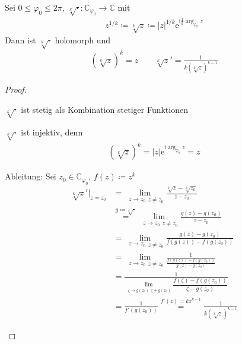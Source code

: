 \documentclass[a4paper,10pt]{scrbook}
\begin{document}
\begin{theorem}[Satz]
  Sei $0 \leq \varphi_0 \leq 2 \pi$, $\sqrt[k]{\cdot} : \mathbb{C}_{\varphi_0} \to \mathbb{C}$ mit
  \begin{align*}
    z^{1/k} \coloneq \sqrt[k]{z} \coloneq |z|^{1/k} \mathrm{e}^{\mathrm{i}\frac{1}{k}\arg_{\varphi_0}z}
  \end{align*}
  Dann ist $\sqrt[k]{\cdot}$ holomorph und
  \begin{align*}
    (\sqrt[k]{z})^k = z \qquad \sqrt[k]{z}' = \frac{1}{k (\sqrt[k]{z})^{k-1}}
  \end{align*}

  \begin{proof}
    \begin{enum-arab}
      \item $\sqrt[k]{\cdot}$ ist stetig als Kombination stetiger Funktionen

      \item $\sqrt[k]{\cdot}$ ist injektiv, denn
      \begin{align*}
        (\sqrt[k]{z})^k = |z| \mathrm{e}^{\mathrm{i} \arg_{\varphi_0}z} = z
      \end{align*}

      \item Ableitung: Sei $z_0 \in \mathbb{C}_{\varphi_0}$, $f(z) \coloneq z^k$
      \begin{align*}
        \sqrt[k]{z}'\Big|_{z=z_0} &= \lim\limits_{\substack{z \to z_0}{z \neq z_0}} \frac{\sqrt[k]{z} - \sqrt[k]{z_0}}{z-z_0} \\
        &\overset{g \coloneq \sqrt[k]{\cdot}}{=} \lim\limits_{\substack{z \to z_0}{z \neq z_0}} \frac{g(z) - g(z_0)}{z-z_0} \\
        &= \lim\limits_{\substack{z \to z_0}{z \neq z_0}} \frac{g(z) - g(z_0)}{f(g(z)) - f(g(z_0))} \\
        &= \lim\limits_{\substack{z \to z_0}{z \neq z_0}} \frac{1}{\frac{f(g(z)) - f(g(z_0))}{g(z) - g(z_0)}} \\
        &= \frac{1}{\lim\limits_{\substack{\zeta \to g(z_0)}{\zeta \neq g(z_0)}} \dfrac{f(\zeta) - f(g(z_0))}{\zeta - g(z_0)}} \\
        &= \frac{1}{f'(g(z_0))} \overset{f'(z)=k z^{k-1}}{=} \frac{1}{k (\sqrt[k]{z})^{k-1}}
      \end{align*}
    \end{enum-arab}
  \end{proof}
\end{theorem}
\end{document}
